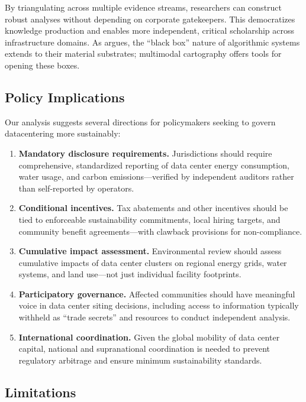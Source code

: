 \documentclass[review]{elsarticle}
\begin{document}
By triangulating across multiple evidence streams, researchers can construct robust analyses without depending on corporate gatekeepers. This democratizes knowledge production and enables more independent, critical scholarship across infrastructure domains. As \citet{Pasquale2015} argues, the ``black box'' nature of algorithmic systems extends to their material substrates; multimodal cartography offers tools for opening these boxes.

\subsection{Policy Implications}

Our analysis suggests several directions for policymakers seeking to govern datacentering more sustainably:

\begin{enumerate}
    \item \textbf{Mandatory disclosure requirements.} Jurisdictions should require comprehensive, standardized reporting of data center energy consumption, water usage, and carbon emissions---verified by independent auditors rather than self-reported by operators.

    \item \textbf{Conditional incentives.} Tax abatements and other incentives should be tied to enforceable sustainability commitments, local hiring targets, and community benefit agreements---with clawback provisions for non-compliance.

    \item \textbf{Cumulative impact assessment.} Environmental review should assess cumulative impacts of data center clusters on regional energy grids, water systems, and land use---not just individual facility footprints.

    \item \textbf{Participatory governance.} Affected communities should have meaningful voice in data center siting decisions, including access to information typically withheld as ``trade secrets'' and resources to conduct independent analysis.

    \item \textbf{International coordination.} Given the global mobility of data center capital, national and supranational coordination is needed to prevent regulatory arbitrage and ensure minimum sustainability standards.
\end{enumerate}

\subsection{Limitations}
\end{document}
